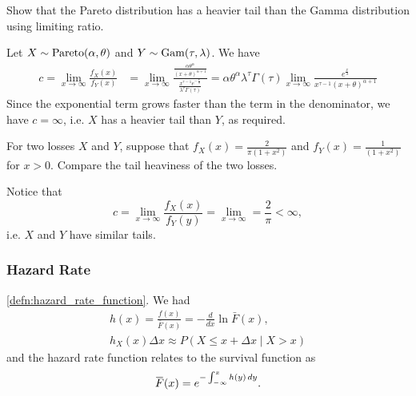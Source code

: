\documentclass[notoc,notitlepage]{tufte-book}
\begin{document}
\begin{eg}
  Show that the Pareto distribution has a heavier tail than the Gamma distribution using limiting ratio.
\end{eg}

\begin{solution}
  Let $X \sim \operatorname{Pareto}(\alpha, \theta)$ and $Y \sim \operatorname{Gam}(\tau, \lambda)$. We have
  \begin{align*}
    c = \lim_{x \to \infty} \frac{f_X(x)}{f_Y(x)} &= \lim_{x \to \infty} \frac{\frac{\alpha \theta^{\alpha}}{{( x + \theta )}^{\alpha + 1}}}{\frac{x^{\tau - 1} e^{-\frac{x}{\lambda}}}{\lambda^\tau \Gamma(\tau)}} = \alpha \theta^\alpha \lambda^\tau \Gamma(\tau) \lim_{x \to \infty} \frac{e^{\frac{x}{\lambda}}}{x^{\tau - 1} {(x + \theta)}^{\alpha + 1}}
  \end{align*}
  Since the exponential term grows faster than the term in the denominator, we have $c = \infty$, i.e. $X$ has a heavier tail than $Y$, as required.
\end{solution}

\begin{eg}
  For two losses $X$ and $Y$, suppose that $f_X(x) = \frac{2}{\pi (1 + x^2)}$ and $f_Y(x) = \frac{1}{(1 + x^2)}$ for $x > 0$. Compare the tail heaviness of the two losses.
\end{eg}

\begin{solution}
  Notice that
  \begin{equation*}
    c = \lim_{x \to \infty} \frac{f_X(x)}{f_Y(y)} = \lim_{x \to \infty} = \frac{2}{\pi} < \infty,
  \end{equation*}
  i.e. $X$ and $Y$ have similar tails.
\end{solution}


\subsubsection{Hazard Rate}%
\label{ssub:hazard_rate}

 \cref{defn:hazard_rate_function}. We had
\begin{gather*}
  h(x) = \frac{f(x)}{\bar{F}(x)} = - \frac{d}{dx} \ln \bar{F}(x), \\
  h_X(x) \Delta x \approx P(X \leq x + \Delta x \mid X > x)
\end{gather*}
and the hazard rate function relates to the survival function as
\begin{equation*}
  \bar{F}(x) = e^{-\int_{-\infty}^{x} h(y) \dif{y} }.
\end{equation*}
\end{document}
